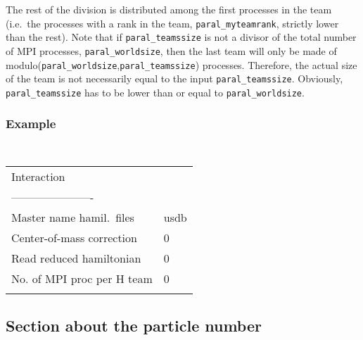 \documentclass[a4paper,11pt]{article}
\newcommand{\ttt}[1]{\texttt{#1}}
\begin{document}
\begin{itemize}
             The rest of the division is distributed among the first processes in the team (i.e.\ the processes with a rank in the team,
             \ttt{paral\_myteamrank}, strictly lower than the rest).
             Note that if \ttt{paral\_teamssize} is not a divisor of the total number of MPI processes, \ttt{paral\_worldsize}, then the last team
             will only be made of modulo(\ttt{paral\_worldsize},\ttt{paral\_teamssize}) processes. Therefore, the actual size of the team is not 
             necessarily equal to the input \ttt{paral\_teamssize}.
             Obviously, \ttt{paral\_teamssize} has to be lower than or equal to \ttt{paral\_worldsize}. \\[0.05cm]
\end{itemize}

\subsubsection*{Example}
\begin{center}
\tt
\begin{tabular}{|ll|}
\hline
Interaction                   &     \\
----------------------        &     \\
Master name hamil.\ files     &usdb \\
Center-of-mass correction     &0    \\
Read reduced hamiltonian      &0    \\
No. of MPI proc per H team    &0    \\
                              &     \\
\hline
\end{tabular}
\end{center}

%
%
\subsection{Section about the particle number}
\end{document}
